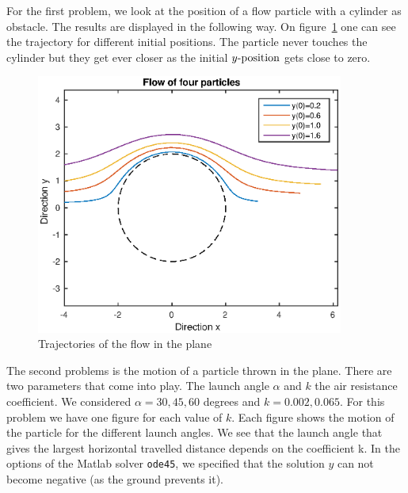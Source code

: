 For the first problem, we look at the position of a flow particle with a cylinder as obstacle. The results are displayed in the following way. On figure~\ref{fig:c1} one can see the trajectory for different initial positions. The particle never touches the cylinder but they get ever closer as the initial $y\text{-position}$ gets close to zero.

\begin{figure}[!h]
\centering
\includegraphics[width = 0.9\textwidth]{./c1.eps}
\caption{Trajectories of the flow in the plane}
\label{fig:c1}
\end{figure}

The second problems is the motion of a particle thrown in the plane. There are two parameters that come into play. The launch angle $\alpha$ and $k$ the air resistance coefficient. We considered $\alpha= 30, 45, 60$ degrees and $k=0.002, 0.065$. For this problem we have one figure for each value of $k$. Each figure shows the motion of the particle for the different launch angles. We see that the launch angle that gives the largest horizontal travelled distance depends on the coefficient k. In the options of the Matlab solver \texttt{ode45}, we specified that the solution $y$ can not become negative (as the ground prevents it).




